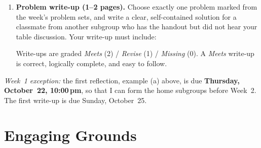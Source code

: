 \documentclass[oneside,11pt]{amsart}
\begin{document}
\begin{enumerate}[(1)]
\item \textbf{Problem write-up (1--2 pages).}
	Choose exactly one problem marked  from the week's
	problem sets, and write a clear, self-contained
	solution for a classmate from another subgroup who has the handout but
	did not hear your table discussion. Your write-up must include:
	Write-ups are graded \emph{Meets} (2) / \emph{Revise} (1) /
	\emph{Missing} (0). A \emph{Meets} write-up is correct, logically
	complete, and easy to follow.
\end{enumerate}
\emph{Week~1 exception:} the first reflection, example (a) above, is due
\textbf{Thursday, October~22, 10:00\,pm}, so that I can form the home
subgroups before Week~2. The first write-up is due Sunday, October~25.

\section{Engaging Grounds}
\end{document}
